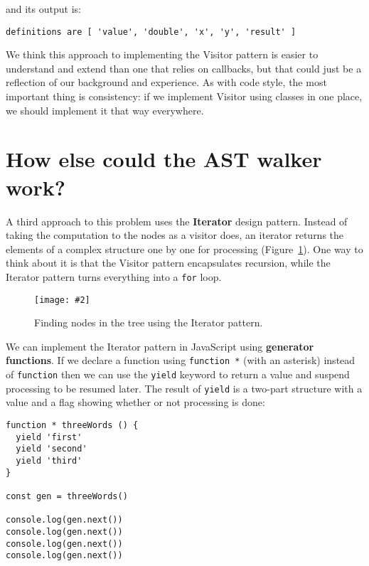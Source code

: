 \documentclass[krantzl]{krantz}
\newcommand{\figpdf}[4]{\begin{figure}%
\centering%
\texttt{[image: \#2]}%
\caption{#3}%
\label{#1}%
\end{figure}}
\newcommand{\figref}[1]{Figure~\ref{#1}}
\newcommand{\glossref}[1]{\textbf{#1}}
\begin{document}
\noindent and its output is:


\begin{lstlisting}[frame=single,frameround=tttt]
definitions are [ 'value', 'double', 'x', 'y', 'result' ]
\end{lstlisting}



We think this approach to implementing the Visitor pattern is easier to understand and extend
than one that relies on callbacks,
but that could just be a reflection of our background and experience.
As with code style,
the most important thing is consistency:
if we implement Visitor using classes in one place,
we should implement it that way everywhere.

\section{How else could the AST walker work?}\label{style-checker-alternatives}


A third approach to this problem uses
the \glossref{Iterator} design pattern.
Instead of taking the computation to the nodes as a visitor does,
an iterator returns the elements of a complex structure one by one for processing
(\figref{style-checker-iterator}).
One way to think about it is that the Visitor pattern encapsulates recursion,
while the Iterator pattern turns everything into a \texttt{for} loop.

\figpdf{style-checker-iterator}{./style-checker/iterator.pdf}{Finding nodes in the tree using the Iterator pattern.}{0.6}


We can implement the Iterator pattern in JavaScript using
\glossref{generator functions}.
If we declare a function using \texttt{function *} (with an asterisk) instead of \texttt{function}
then we can use the \texttt{yield} keyword to return a value and suspend processing to be resumed later.
The result of \texttt{yield} is a two-part structure with a value and a flag showing whether or not processing is done:


\begin{lstlisting}[frame=single,frameround=tttt]
function * threeWords () {
  yield 'first'
  yield 'second'
  yield 'third'
}

const gen = threeWords()

console.log(gen.next())
console.log(gen.next())
console.log(gen.next())
console.log(gen.next())
\end{lstlisting}
\end{document}
